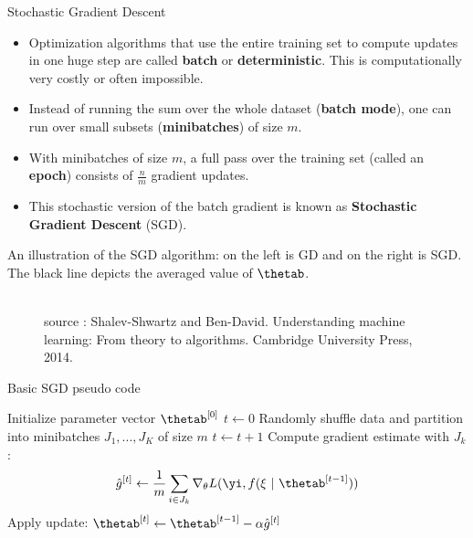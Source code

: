 \begin{vbframe}{Stochastic Gradient Descent}
\begin{itemize}
\lz
\item Optimization algorithms that use the entire training set to compute updates in one huge step are called \textbf{batch} or \textbf{deterministic}. This is computationally very costly or often impossible.
\lz
\item Instead of running the sum over the whole dataset (\textbf{batch mode}), one can run over small subsets (\textbf{minibatches}) of size $m$.
\lz
\item With minibatches of size $m$, a full pass over the training set (called an \textbf{epoch}) consists of $\frac{n}{m}$ gradient updates.
\lz
\item This stochastic version of the batch gradient is known as \textbf{Stochastic Gradient Descent} (SGD).
\end{itemize}
\framebreak

An illustration of the SGD algorithm: on the left is GD and on the right is SGD. The black line depicts the averaged value of $\thetab$.

\begin{figure}
\tiny{\\ source : Shalev-Shwartz and  Ben-David.
Understanding machine learning: From theory to algorithms. Cambridge University Press, 2014.}
\end{figure}
\framebreak

  \begin{algorithm}[H]
  \footnotesize
    \caption{Basic SGD pseudo code}
    \begin{algorithmic}[1]
    \State Initialize parameter vector $\thetab^{[0]}$
    \State $t \leftarrow 0$
    \State Randomly shuffle data and partition into minibatches $J_1, ..., J_K$ of size $m$
      \State $t \leftarrow t + 1$
      \State Compute gradient estimate with $J_k$:
      \[\hat{g}^{[t]} \leftarrow \frac{1}{m} \sum_{i \in J_k} \nabla_\theta L(\yi, f(\xi ~|~ \thetab^{[t-1]}))
      \]
      \State Apply update: $\thetab^{[t]} \leftarrow \thetab^{[t-1]} - \alpha \hat{g}^{[t]}$
      \EndFor
      \EndWhile
    \end{algorithmic}
  \end{algorithm}
\end{vbframe}


